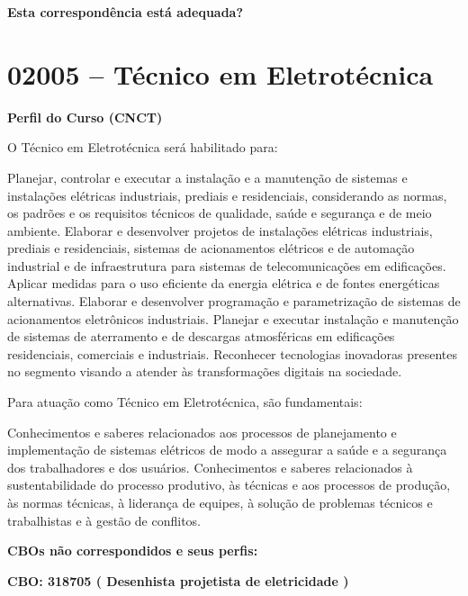 \documentclass[
]{article}
\begin{document}
\begin{Form}
\textbf{Esta correspondência está adequada?} \\ 
\end{Form}

\newpage
\section{ 02005 -- Técnico em Eletrotécnica }

\textbf{Perfil do Curso (CNCT)}

O Técnico em Eletrotécnica será habilitado para:

Planejar, controlar e executar a instalação e a manutenção de sistemas e
instalações elétricas industriais, prediais e residenciais, considerando
as normas, os padrões e os requisitos técnicos de qualidade, saúde e
segurança e de meio ambiente. Elaborar e desenvolver projetos de
instalações elétricas industriais, prediais e residenciais, sistemas de
acionamentos elétricos e de automação industrial e de infraestrutura
para sistemas de telecomunicações em edificações. Aplicar medidas para o
uso eficiente da energia elétrica e de fontes energéticas alternativas.
Elaborar e desenvolver programação e parametrização de sistemas de
acionamentos eletrônicos industriais. Planejar e executar instalação e
manutenção de sistemas de aterramento e de descargas atmosféricas em
edificações residenciais, comerciais e industriais. Reconhecer
tecnologias inovadoras presentes no segmento visando a atender às
transformações digitais na sociedade.

Para atuação como Técnico em Eletrotécnica, são fundamentais:

Conhecimentos e saberes relacionados aos processos de planejamento e
implementação de sistemas elétricos de modo a assegurar a saúde e a
segurança dos trabalhadores e dos usuários. Conhecimentos e saberes
relacionados à sustentabilidade do processo produtivo, às técnicas e aos
processos de produção, às normas técnicas, à liderança de equipes, à
solução de problemas técnicos e trabalhistas e à gestão de conflitos.

\textbf{CBOs não correspondidos e seus perfis:}

\textbf{CBO: 318705  ( Desenhista projetista de eletricidade )}
\end{document}

